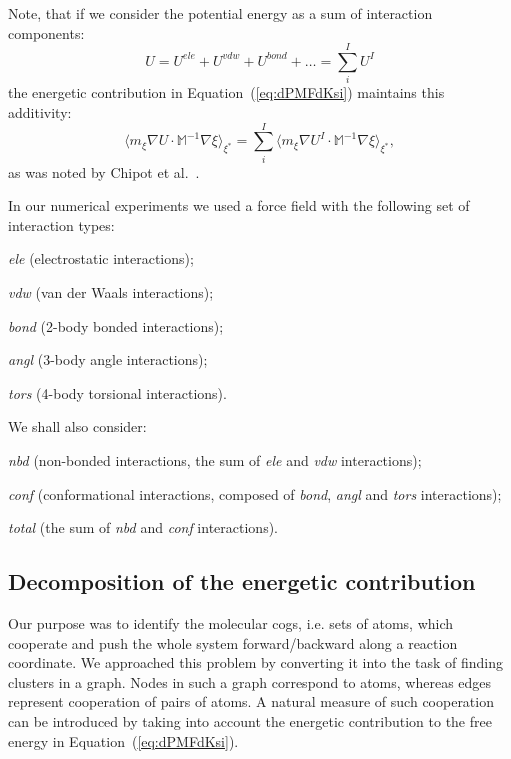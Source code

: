 Note, that if we consider the potential energy as a sum of interaction components:
\begin{equation}
\nonumber U = U^{ele}+U^{vdw}+U^{bond}+\ldots =  \sum_{i}^I U^I 
\end{equation}
the  energetic contribution in Equation~(\ref{eq:dPMFdKsi}) maintains this additivity:
\begin{equation}
\langle m_\xi  \nabla U\cdot \mathbb{M}^{-1} \nabla\xi\rangle_{\xi^*} =  \sum_i^{I} \langle m_\xi \nabla U^I\cdot \mathbb{M}^{-1}\nabla\xi\rangle_{\xi^*} ,
\end{equation}
as was noted by Chipot et al.~\cite{chipot2007free}.

In our numerical experiments we used a force field with the following set of interaction types:
\begin{packeditemize}
 \item \emph{ele} (electrostatic interactions);
 \item \emph{vdw} (van der Waals interactions);
 \item \emph{bond} (2-body bonded interactions);
 \item \emph{angl} (3-body angle interactions);
 \item \emph{tors} (4-body torsional interactions).
\end{packeditemize}
We shall also consider:
\begin{packeditemize} 
 \item \emph{nbd} (non-bonded interactions, the sum of \emph{ele} and \emph{vdw} interactions);
 \item \emph{conf} (conformational interactions, composed of \emph{bond}, \emph{angl} and \emph{tors} interactions);
 \item \emph{total} (the sum of \emph{nbd} and \emph{conf} interactions).
\end{packeditemize}

\subsection*{Decomposition of the energetic contribution}\label{sec:decomposition}
Our purpose was to identify the molecular cogs{\color{black}, i.e.} sets of atoms, which cooperate and push the whole system forward/backward along a reaction coordinate.
We approached this problem by converting it {\color{black}in}to the task of finding clusters in a graph.
Nodes in such a graph correspond to atoms, whereas edges represent cooperation of pairs of atoms.
A natural measure of such cooperation can be introduced by taking into account the energetic contribution to the free energy in Equation~(\ref{eq:dPMFdKsi}).

